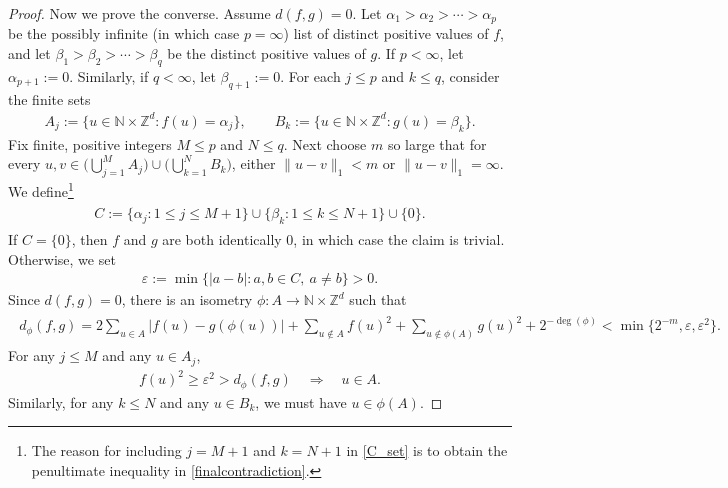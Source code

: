 \documentclass[11pt,reqno]{amsart}
\numberwithin{equation}{section}
\theoremstyle{definition}
\begin{document}
\begin{proof}
Now we prove the converse.
Assume $d(f,g) = 0$.
Let $\alpha_1 > \alpha_2 > \cdots > \alpha_p$ be the possibly infinite (in which case $p = \infty$) list of distinct positive values of $f$, and let
$\beta_1 > \beta_2 > \cdots > \beta_q$ be the distinct positive values of $g$.
If $p < \infty$, let $\alpha_{p+1} := 0$. 
Similarly, if $q < \infty$, let $\beta_{q+1} := 0$. 
For each $j \leq p$ and $k \leq q$, consider the finite sets
{\begin{align*} {
A_j := \{u \in {\mathbb{N}} \times {\mathbb{Z}}^d : f(u) = \alpha_j\}, \qquad
B_k := \{u \in {\mathbb{N}} \times {\mathbb{Z}}^d : g(u) = \beta_k\}.
} \end{align*}}
Fix finite, positive integers $M \leq p$ and $N \leq q$. 
Next choose $m$ so large that for every $u,v \in \big(\bigcup_{j = 1}^{M} A_j\big) \cup \big(\bigcup_{k = 1}^{N} B_k\big)$, either $\|u - v\|_1 < m$ or $\|u - v\|_1 = \infty$.
We define\footnote{The reason for including $j = M+1$ and $k = N+1$ in \eqref{C_set} is to obtain the penultimate inequality in \eqref{finalcontradiction}.}
{\begin{align} \begin{split} {
C := \{\alpha_j : 1 \leq j \leq M+1\} \cup \{\beta_k : 1 \leq k \leq N+1\} \cup \{0\}. \label{C_set}
} \end{split} \end{align}}
If $C = \{0\}$, then $f$ and $g$ are both identically 0, in which case the claim is trivial.
Otherwise, we set
{\begin{align*} {
{\varepsilon} := \min\{|a - b| : a, b \in C,\ a \neq b\} > 0.
} \end{align*}}
Since $d(f,g) = 0$, there is an isometry $\phi : A \to {\mathbb{N}} \times {\mathbb{Z}}^d$ such that
{\begin{align} \begin{split} {
d_\phi(f,g) = 2\sum_{u \in A} |f(u) - g(\phi(u))| + \sum_{u \notin A} f(u)^2 + \sum_{u \notin \phi(A)} g(u)^2 + 2^{-\deg(\phi)} < \min\{2^{-m},{\varepsilon},{\varepsilon}^2\}. \label{3_inequalities}
} \end{split} \end{align}}
For any $j \leq M$ and any $u \in A_j$,
{\begin{align*} {
f(u)^2 \geq {\varepsilon}^2 > d_\phi(f,g) \quad \Rightarrow \quad u \in A.
} \end{align*}}
Similarly, for any $k \leq N$ and any $u \in B_k$, we must have $u \in \phi(A)$.


\end{proof}
\end{document}
